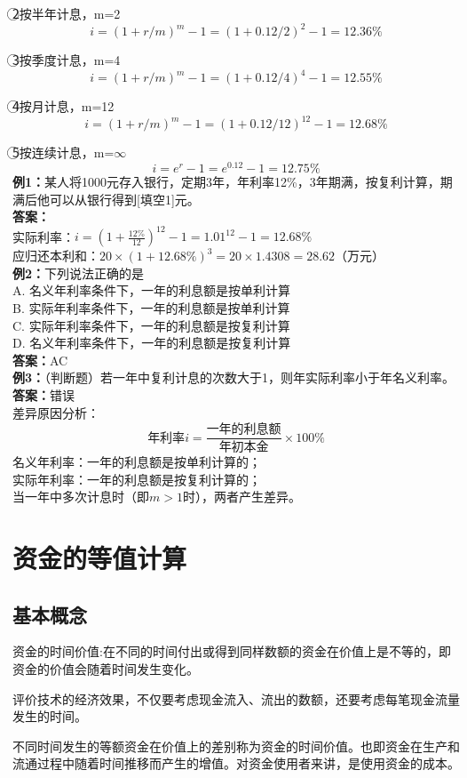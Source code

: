 \documentclass[12pt, a4paper, oneside]{ctexbook}
\begin{document}
\textcircled{2}按半年计息，m=2
$$i = (1+ r/m)^m-1=(1+0.12/2)^2-1=12.36\%$$

\textcircled{3}按季度计息，m=4
$$i = (1+ r/m)^m-1=(1+0.12/4)^4-1=12.55\%$$

\textcircled{4}按月计息，m=12
$$i = (1+ r/m)^m-1=(1+0.12/12)^{12}-1=12.68\%$$

\textcircled{5}按连续计息，m=$\infty$
$$i=e^r-1=e^{0.12}-1=12.75\%$$
\textbf{例1：}某人将1000元存入银行，定期3年，年利率12\%，3年期满，按复利计算，期满后他可以从银行得到[填空1]元。\\
\textbf{答案：}\\
实际利率：$i=(1+\frac{12\%}{12})^{12}-1=1.01^{12}-1=12.68\%$\\
应归还本利和：$20 \times (1+12.68\%)^3=20 \times 1.4308=28.62$（万元）\\
\textbf{例2：}下列说法正确的是\\
A. 名义年利率条件下，一年的利息额是按单利计算
\\
B. 实际年利率条件下，一年的利息额是按单利计算
\\
C. 实际年利率条件下，一年的利息额是按复利计算
\\
D. 名义年利率条件下，一年的利息额是按复利计算\\
\textbf{答案：}AC\\
\textbf{例3：}（判断题）若一年中复利计息的次数大于1，则年实际利率小于年名义利率。\\
\textbf{答案：}错误\\
差异原因分析：
$$\mbox{年利率}i=\frac{\mbox{一年的利息额}}{\mbox{年初本金}} \times 100\%$$
名义年利率：一年的利息额是按单利计算的；\\
实际年利率：一年的利息额是按复利计算的；\\
当一年中多次计息时（即$m>1$时），两者产生差异。


\section{资金的等值计算}

\subsection{基本概念}

资金的时间价值:在不同的时间付出或得到同样数额的资金在价值上是不等的，即资金的价值会随着时间发生变化。

评价技术的经济效果，不仅要考虑现金流入、流出的数额，还要考虑每笔现金流量发生的时间。

不同时间发生的等额资金在价值上的差别称为资金的时间价值。也即资金在生产和流通过程中随着时间推移而产生的增值。对资金使用者来讲，是使用资金的成本。
\end{document}
